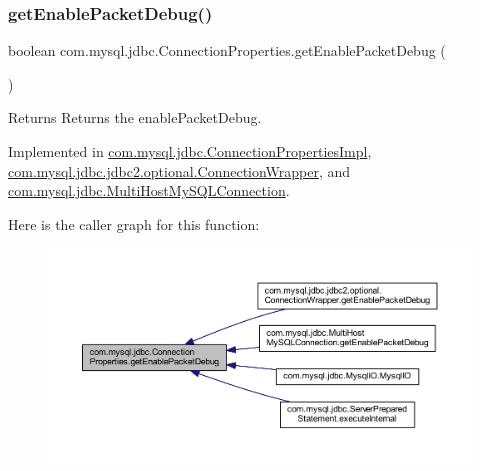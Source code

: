 \subsubsection{\texorpdfstring{get\+Enable\+Packet\+Debug()}{getEnablePacketDebug()}}
{\footnotesize\ttfamily boolean com.\+mysql.\+jdbc.\+Connection\+Properties.\+get\+Enable\+Packet\+Debug (\begin{DoxyParamCaption}{ }\end{DoxyParamCaption})}

\begin{DoxyReturn}{Returns}
Returns the enable\+Packet\+Debug. 
\end{DoxyReturn}


Implemented in \mbox{\hyperlink{classcom_1_1mysql_1_1jdbc_1_1_connection_properties_impl_aa19f3ea922a728eee3891e844fccadae}{com.\+mysql.\+jdbc.\+Connection\+Properties\+Impl}}, \mbox{\hyperlink{classcom_1_1mysql_1_1jdbc_1_1jdbc2_1_1optional_1_1_connection_wrapper_a461ba0551d56c29d54b68ea0f12a875d}{com.\+mysql.\+jdbc.\+jdbc2.\+optional.\+Connection\+Wrapper}}, and \mbox{\hyperlink{classcom_1_1mysql_1_1jdbc_1_1_multi_host_my_s_q_l_connection_a4f5817273d152c100a22b77fa4cf957f}{com.\+mysql.\+jdbc.\+Multi\+Host\+My\+S\+Q\+L\+Connection}}.

Here is the caller graph for this function\+:\nopagebreak
\begin{figure}[H]
\begin{center}
\leavevmode
\includegraphics[width=350pt]{interfacecom_1_1mysql_1_1jdbc_1_1_connection_properties_accdc773d99a84b7b1db522aa324d6084_icgraph}
\end{center}
\end{figure}
\mbox{\label{interfacecom_1_1mysql_1_1jdbc_1_1_connection_properties_a51ec93b6fe482627e109814e0985c940}} 
